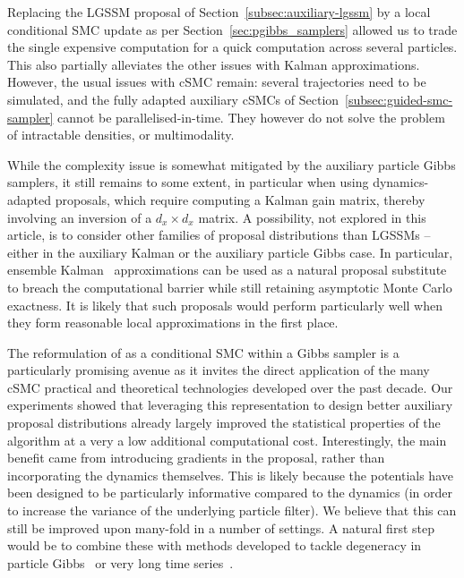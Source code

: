 Replacing the LGSSM proposal of Section~\ref{subsec:auxiliary-lgssm} by a local conditional SMC update as per Section~\ref{sec:pgibbs_samplers} allowed us to trade the single expensive computation for a quick computation across several particles. This also partially alleviates the other issues with Kalman approximations. However, the usual issues with cSMC remain: several trajectories need to be simulated, and the fully adapted auxiliary cSMCs of Section~\ref{subsec:guided-smc-sampler} cannot be parallelised-in-time. They however do not solve the problem of intractable densities, or multimodality.

While the complexity issue is somewhat mitigated by the auxiliary particle Gibbs samplers, it still remains to some extent, in particular when using dynamics-adapted proposals, which require computing a Kalman gain matrix, thereby involving an inversion of a $d_x \times d_x$ matrix. A possibility, not explored in this article, is to consider other families of proposal distributions than LGSSMs -- either in the auxiliary Kalman or the auxiliary particle Gibbs case. In particular, ensemble Kalman~\citep{frei2013bridging} approximations can be used as a natural proposal substitute to breach the computational barrier while still retaining asymptotic Monte Carlo exactness. It is likely that such proposals would perform particularly well when they form reasonable local approximations in the first place.

The reformulation of \citet{finke2021csmc} as a conditional SMC within a Gibbs sampler is a particularly promising avenue as it invites the direct application of the many cSMC practical and theoretical technologies developed over the past decade. Our experiments showed that leveraging this representation to design better auxiliary proposal distributions already largely improved the statistical properties of the algorithm at a very a low additional computational cost. Interestingly, the main benefit came from introducing gradients in the proposal, rather than incorporating the dynamics themselves. This is likely because the potentials have been designed to be particularly informative compared to the dynamics (in order to increase the variance of the underlying particle filter). We believe that this can still be improved upon many-fold in a number of settings. A natural first step would be to combine these with methods developed to tackle degeneracy in particle Gibbs~\citep[e.g.][]{lindsten2015degenerate} or very long time series~\citep{Karppinen2022bridge}.


